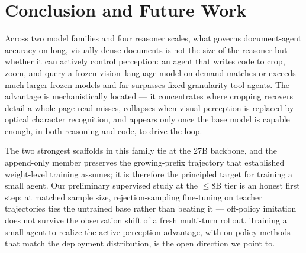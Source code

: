\section{Conclusion and Future Work}
\label{sec:conclusion}

Across two model families and four reasoner scales, what governs document-agent accuracy on long, visually dense documents is not the size of the reasoner but whether it can actively control perception: an agent that writes code to crop, zoom, and query a frozen vision--language model on demand matches or exceeds much larger frozen models and far surpasses fixed-granularity tool agents. The advantage is mechanistically located --- it concentrates where cropping recovers detail a whole-page read misses, collapses when visual perception is replaced by optical character recognition, and appears only once the base model is capable enough, in both reasoning and code, to drive the loop.

The two strongest scaffolds in this family tie at the 27B backbone, and the append-only member preserves the growing-prefix trajectory that established weight-level training assumes; it is therefore the principled target for training a small agent. Our preliminary supervised study at the $\leq$8B tier is an honest first step: at matched sample size, rejection-sampling fine-tuning on teacher trajectories ties the untrained base rather than beating it --- off-policy imitation does not survive the observation shift of a fresh multi-turn rollout. Training a small agent to realize the active-perception advantage, with on-policy methods that match the deployment distribution, is the open direction we point to.
